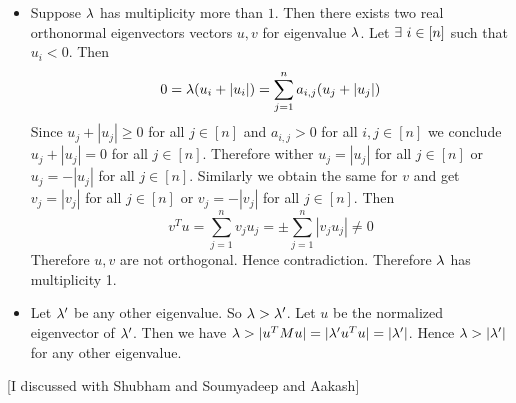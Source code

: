 \documentclass[a4paper, 11pt]{article}
\begin{document}
{\begin{itemize}
Since $\lm$ is an eigenvalue of $M$ let $w$ be the normalized real eigenvector of $M$ with corresponding eigen value $\lm$. Let $M=(m_{i,j})_{1\leq i,j\leq n}$. Now define the vector $x$, where $x_i=|w_i|$. Now $$0<\lm = \sum_{i,j}m_{i,j}w_iw_j=\lt| \sum_{i,j}m_{i,j}w_iw_j\rt|\leq \sum_{i,j}m_{i,j}|w_i||w_j|=\sum_{i,j}m_{i,j}x_ix_j\leq \lm$$ Therefore $x$ is an eigenvector with eigenvalue $\lm$. Hence we have $Mx=\lm x$ and $x$ has all entries nonnegative. Now if for any $i\in[n]$, $x_i\neq 0$ since $\lm x_i=\sum_{j=1}^n a_{i,j}x_j$ and at least one $x_j\neq 0$. Hence all the entries of $x$ are positive.
\item Suppose $\lm$ has multiplicity more than $1$. Then there exists two real orthonormal eigenvectors vectors $u,v$ for eigenvalue $\lm$. Let $\exists\ i\in[n]$ such that $u_i<0$. Then $$0=\lambda (u_i+|u_i|)=\sum_{j=1}^n a_{i,j}(u_j+|u_j|)$$Since $u_j+|u_j|\geq 0$ for all $j\in[n]$ and $a_{i,j}>0$ for all $i,j\in[n]$ we conclude $u_j+|u_j|=0$ for all $j\in [n]$. Therefore wither $u_j=|u_j|$ for all $j\in[n]$ or $u_j=-|u_j|$ for all $j\in [n]$. Similarly we obtain the same for $v$ and get $v_j=|v_j|$ for all $j\in [n]$ or $v_j=-|v_j|$ for all $j\in [n]$. Then $$v^Tu=\sum_{j=1}^n v_ju_j=\pm \sum_{j=1}^n |v_ju_j|\neq 0$$Therefore $u,v$ are not orthogonal. Hence contradiction. Therefore $\lm$ has multiplicity 1.
\item Let $\lambda'$ be any other eigenvalue. So $\lambda>\lambda'$. Let $u$ be the normalized eigenvector of $\lambda'$. Then we have $\lambda>|u^TMu|=|\lambda' u^Tu|=|\lambda'|$. Hence $\lambda>|\lambda'|$ for any other eigenvalue. 
\end{itemize}
}\parinf

[I discussed with Shubham and Soumyadeep and Aakash]\parinn

\end{document}
